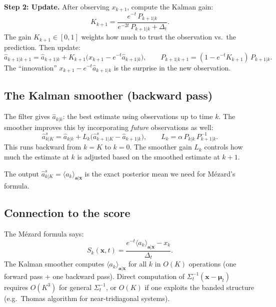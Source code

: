 \documentclass[11pt,a4paper]{article}
\newcommand{\Dt}{\Delta_t}
\begin{document}
\textbf{Step 2: Update.}  After observing $x_{k+1}$, compute the Kalman gain:
\begin{equation}
  K_{k+1} = \frac{e^{-t}\,P_{k+1|k}}{e^{-2t}\,P_{k+1|k} + \Dt}.
\end{equation}
The gain $K_{k+1} \in [0, 1]$ weights how much to trust the observation vs.\ the prediction.  Then update:
\begin{equation}
  \hat{a}_{k+1|k+1} = \hat{a}_{k+1|k} + K_{k+1}\bigl(x_{k+1} - e^{-t}\hat{a}_{k+1|k}\bigr), \qquad
  P_{k+1|k+1} = (1 - e^{-t}K_{k+1})\,P_{k+1|k}.
\end{equation}
The ``innovation'' $x_{k+1} - e^{-t}\hat{a}_{k+1|k}$ is the surprise in the new observation.

\subsection{The Kalman smoother (backward pass)}

The filter gives $\hat{a}_{k|k}$: the best estimate using observations up to time $k$.  The smoother improves this by incorporating \emph{future} observations as well:
\begin{equation}
  \hat{a}^s_{k|K} = \hat{a}_{k|k} + L_k\bigl(\hat{a}^s_{k+1|K} - \hat{a}_{k+1|k}\bigr), \qquad L_k = \alpha\,P_{k|k}\,P_{k+1|k}^{-1}.
\end{equation}
This runs backward from $k = K$ to $k = 0$.  The smoother gain $L_k$ controls how much the estimate at $k$ is adjusted based on the smoothed estimate at $k+1$.

The output $\hat{a}^s_{k|K} = \langle a_k \rangle_{\mathbf{a}|\mathbf{x}}$ is the exact posterior mean we need for M\'ezard's formula.

\subsection{Connection to the score}

The M\'ezard formula says:
\begin{equation}
  S_k(\mathbf{x}, t) = \frac{e^{-t}\langle a_k \rangle_{\mathbf{a}|\mathbf{x}} - x_k}{\Dt}.
\end{equation}
The Kalman smoother computes $\langle a_k \rangle_{\mathbf{a}|\mathbf{x}}$ for all $k$ in $O(K)$ operations (one forward pass + one backward pass).  Direct computation of $\Sigma_t^{-1}(\mathbf{x} - \bm{\mu}_t)$ requires $O(K^3)$ for general $\Sigma_t^{-1}$, or $O(K)$ if one exploits the banded structure (e.g.\ Thomas algorithm for near-tridiagonal systems).
\end{document}
